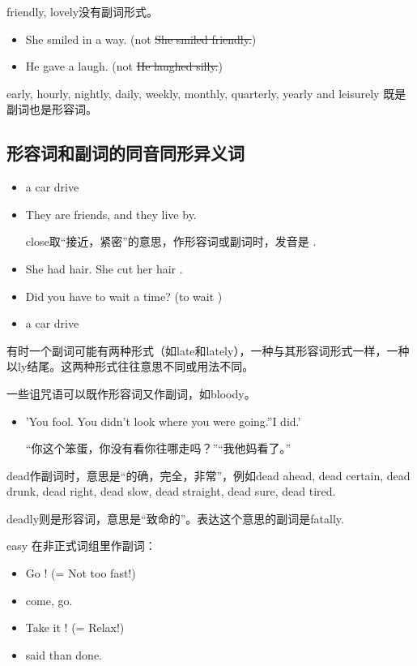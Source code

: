 friendly, lovely没有副词形式。
\begin{itemize}
\item She smiled in a  way. (not \sout{She smiled friendly.})
\item He gave a  laugh. (not \sout{He laughed silly.})
\end{itemize}

early, hourly, nightly, daily, weekly, monthly, quarterly, yearly and leisurely 既是副词也是形容词。

\subsection{形容词和副词的同音同形异义词}

\begin{itemize}
\item a  car drive 
\item They are  friends, and they live  by.

 close取“接近，紧密”的意思，作形容词或副词时，发音是 .
\item She had  hair. She cut her hair .

\item Did you have to wait a  time? (to wait )

\item a  car drive 
\end{itemize}

有时一个副词可能有两种形式（如late和lately），一种与其形容词形式一样，一种
以ly结尾。这两种形式往往意思不同或用法不同。

一些诅咒语可以既作形容词又作副词，如bloody。
\begin{itemize}
\item 'You  fool. You didn't look where you were going.''I  did.'

  “你这个笨蛋，你没有看你往哪走吗？”“我他妈看了。”
\end{itemize}

dead作副词时，意思是“的确，完全，非常”，例如dead ahead, dead certain, dead
drunk, dead right, dead slow, dead straight, dead sure, dead tired.

deadly则是形容词，意思是“致命的”。表达这个意思的副词是fatally.

easy 在非正式词组里作副词：
\begin{itemize}
\item Go ! (= Not too fast!)
\item {} come,  go.
\item Take it ! (= Relax!)
\item {} said than done.
\end{itemize}

